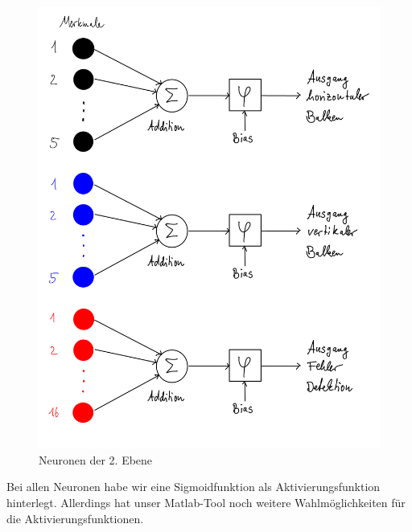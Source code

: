 \begin{figure}[hbt]
	\centering
	\includegraphics[width=0.8\linewidth]{./Bilder/Auswertung/Aufbau/page7}
	\caption{Neuronen der 2. Ebene}
	\label{Neurin2Ebene}
\end{figure}

Bei allen Neuronen habe wir eine Sigmoidfunktion als Aktivierungsfunktion hinterlegt. Allerdings hat unser Matlab-Tool noch weitere Wahlmöglichkeiten für die Aktivierungsfunktionen. 
